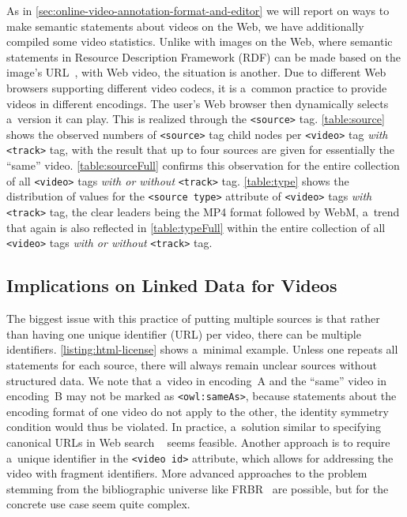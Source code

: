 \documentclass{sig-alternate}
\begin{document}
As in \autoref{sec:online-video-annotation-format-and-editor}
we will report on ways to make semantic statements
about videos on the Web,
we have additionally compiled some video statistics.
Unlike with images on the Web, where
semantic statements in
Resource Description Framework (RDF)
can be made based on the image's
URL~\cite{linsley2009rdfa},
with Web video, the situation is another.
Due to different Web browsers supporting
different video codecs,
it is a~common practice to provide videos
in different encodings.
The user's Web browser then dynamically selects
a~version it can play.
This is realized through the \texttt{<source>} tag.
\autoref{table:source} shows the observed numbers of
\texttt{<source>} tag child nodes per
\texttt{<video>} tag \emph{with} \texttt{<track>} tag,
with the result that up to
four sources are given for essentially the ``same'' video.
\autoref{table:sourceFull} confirms this observation
for the entire collection of all \texttt{<video>} tags
\emph{with or without} \texttt{<track>} tag.
\autoref{table:type} shows the distribution
of values for the \texttt{<source type>} attribute
of \texttt{<video>} tags \emph{with} \texttt{<track>} tag,
the clear leaders being the MP4 format
followed by WebM,
a~trend that again is also reflected
in \autoref{table:typeFull}
within the entire collection
of all \texttt{<video>} tags
\emph{with or without} \texttt{<track>} tag.

\subsection{Implications on Linked Data for Videos}
\label{sec:implications-on-linked-data-for-videos}

The biggest issue with this practice
of putting multiple sources is that
rather than having one unique identifier (URL) per video,
there can be multiple identifiers.
\autoref{listing:html-license} shows a~minimal example.
Unless one repeats all statements for each source,
there will always remain unclear sources without structured data.
We note that a~video in encoding~A
and the ``same'' video in encoding~B
may not be marked as \texttt{<owl:sameAs>},
because statements about the encoding format
of one video do not apply to the other,
the identity symmetry condition would thus be violated.
In practice, a~solution similar to
specifying canonical URLs in Web search%
~\cite{kupke2009canonical} seems feasible.
Another approach is to require a~unique identifier
in the \texttt{<video id>} attribute,
which allows for addressing the video
with fragment identifiers.
More advanced approaches to the problem
stemming from the bibliographic universe
like FRBR~\cite{tillett2004frbr} are possible,
but for the concrete use case seem quite complex.
\end{document}
